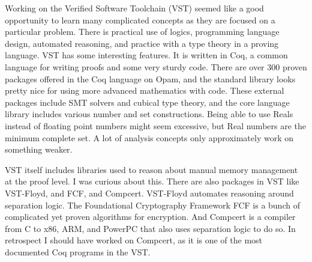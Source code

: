  Working on the Verified Software Toolchain (VST) seemed like a good opportunity to learn many complicated concepts as they are focused on a particular problem. There is practical use of logics, programming language design, automated reasoning, and practice with a type theory in a proving language. VST has some interesting features. It is written in Coq, a common language for writing proofs and some very sturdy code. There are over 300 proven packages offered in the Coq language on Opam, and the standard library looks pretty nice for using more advanced mathematics with code. \cite{noauthor_opam_nodate} These external packages include SMT solvers and cubical type theory, and the core language library includes various number and set constructions. Being able to use Reals instead of floating point numbers might seem excessive, but Real numbers are the minimum complete set. A lot of analysis concepts only approximately work on something weaker. 
 
 VST itself includes libraries used to reason about manual memory management at the proof level. I was curious about this. There are also packages in VST like VST-Floyd, and FCF, and Compcert. VST-Floyd automates reasoning around separation logic. The Foundational Cryptography Framework FCF is a bunch of complicated yet proven algorithms for encryption. And Compcert is a compiler from C to x86, ARM, and PowerPC that also uses separation logic to do so. In retrospect I should have worked on Compcert, as it is one of the most documented Coq programs in the VST.
